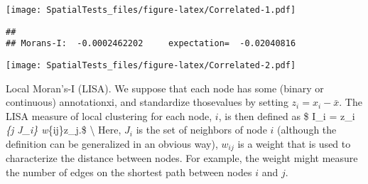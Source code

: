 \documentclass[]{article}
\newenvironment{Shaded}{\begin{snugshade}}{\end{snugshade}}
\newcommand{\CharTok}[1]{\textcolor[rgb]{0.31,0.60,0.02}{#1}}
\newcommand{\CommentTok}[1]{\textcolor[rgb]{0.56,0.35,0.01}{\textit{#1}}}
\newcommand{\DataTypeTok}[1]{\textcolor[rgb]{0.13,0.29,0.53}{#1}}
\newcommand{\DecValTok}[1]{\textcolor[rgb]{0.00,0.00,0.81}{#1}}
\newcommand{\KeywordTok}[1]{\textcolor[rgb]{0.13,0.29,0.53}{\textbf{#1}}}
\newcommand{\NormalTok}[1]{#1}
\newcommand{\OperatorTok}[1]{\textcolor[rgb]{0.81,0.36,0.00}{\textbf{#1}}}
\newcommand{\StringTok}[1]{\textcolor[rgb]{0.31,0.60,0.02}{#1}}
\begin{document}
\texttt{[image: SpatialTests\_files/figure-latex/Correlated-1.pdf]}

\begin{Shaded}
\end{Shaded}

\begin{verbatim}
## 
## Morans-I:  -0.0002462202     expectation=  -0.02040816
\end{verbatim}

\begin{Shaded}
\end{Shaded}

\texttt{[image: SpatialTests\_files/figure-latex/Correlated-2.pdf]}

Local Moran's-I (LISA). We suppose that each node has some (binary or
continuous) annotationxi, and standardize thosevalues by setting
\(z_i=x_i−\bar{x}\). The LISA measure of local clustering for each node,
\(i\), is then defined as \$ I\_i = z\_i \sum\emph{\{j \in J\_i\}
w}\{ij\}z\_j.\$ \textbackslash{} Here, \(J_i\) is the set of neighbors
of node \(i\) (although the definition can be generalized in an obvious
way), \(w_{ij}\) is a weight that is used to characterize the distance
between nodes. For example, the weight might measure the number of edges
on the shortest path between nodes \(i\) and \(j\).
\end{document}
